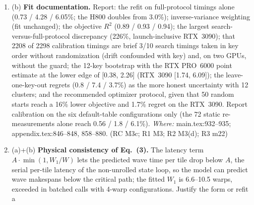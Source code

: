 \documentclass[11pt]{article}
\begin{document}
\begin{enumerate}[label=M4\alph*.]
        MLP over five seeds (1.59 / 1.31 / 7.13, mean 3.34) and the structural
        MLP (3.75 / 4.90 / 1.11, mean 3.25); ``within 3.5\% on every GPU'' and
        ``best on the RTX PRO~6000'' use the frozen form selected on two
        GPUs' calls. State plainly that on the only form-blind GPU (H800) the
        full form is not better than the restriction (paired $-0.53$ [$-1.35$,
        $+0.60$], Table S15) and is beaten by the structural MLP (0.57\%; 1.1\%
        over five seeds); across GPUs it is better only on the RTX PRO~6000
        ($-3.80$ [$-4.78$, $-2.89$]) and worse on the RTX~3090 ($+2.66$
        [$+2.12$, $+3.17$]). The H800 nine-parameter variant (add\_l2\_miss)
        reproduces the frozen form exactly (3.0077\%), so it is not
        independent evidence. Move the three-parameter top-3 result into
        Table~5 so that the abstract claim has a main-text anchor. (DA C4; R1
        M3 fix (iii); RC M9c)
  \item (b) \textbf{Fit documentation.} Report: the refit on full-protocol
        timings alone (0.73 / 4.28 / 6.05\%; the H800 doubles from 3.0\%);
        inverse-variance weighting (fit unchanged); the objective $R^2$ (0.89 /
        0.93 / 0.94); the largest search-versus-full-protocol discrepancy
        (226\%, launch-inclusive RTX~3090); that 2208 of 2298 calibration
        timings are brief 3/10 search timings taken in key order without
        randomization (drift confounded with key) and, on two GPUs, without
        the guard; the 12-key bootstrap with the RTX PRO~6000 point estimate at
        the lower edge of [0.38, 2.26] (RTX~3090 [1.74, 6.09]); the
        leave-one-key-out regrets (0.8 / 7.4 / 3.7\%) as the more honest
        uncertainty with 12 clusters; and the recommended optimizer protocol,
        given that 50 random starts reach a 16\% lower objective and 1.7\%
        regret on the RTX~3090. Report calibration on the six default-table
        configurations only (the 72 static re-measurements alone reach 0.56 /
        1.8 / 6.1\%). \emph{Where:} main.tex:932--935; appendix.tex:846--848,
        858--880. (RC M3c; R1 M3; R2 M3(d); R3 m22)
  \item (a)+(b) \textbf{Physical consistency of Eq.~(3).} The latency term
        $A\cdot\min(1, W_1/W)$ lets the predicted wave time per tile drop below
        $A$, the serial per-tile latency of the non-unrolled state loop, so
        the model can predict wave makespans below the critical path; the
        fitted $W_1$ is 6.6--10.5 warps, exceeded in batched calls with 4-warp
        configurations. Justify the form or refit a

\end{enumerate}
\end{document}
